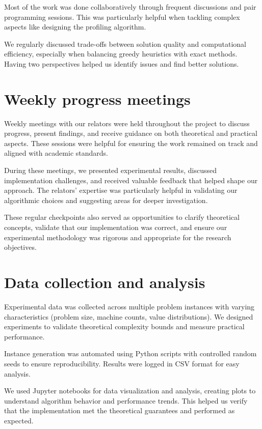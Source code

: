 Most of the work was done collaboratively through frequent discussions and pair programming sessions.
This was particularly helpful when tackling complex aspects like designing the profiling algorithm.

We regularly discussed trade-offs between solution quality and computational efficiency, especially when balancing greedy heuristics with exact methods.
Having two perspectives helped us identify issues and find better solutions.

\section{Weekly progress meetings}

Weekly meetings with our relators were held throughout the project to discuss progress, present findings, and receive guidance on both theoretical and practical aspects.
These sessions were helpful for ensuring the work remained on track and aligned with academic standards.

During these meetings, we presented experimental results, discussed implementation challenges, and received valuable feedback that helped shape our approach.
The relators' expertise was particularly helpful in validating our algorithmic choices and suggesting areas for deeper investigation.

These regular checkpoints also served as opportunities to clarify theoretical concepts, validate that our implementation was correct, and ensure our experimental methodology was rigorous and appropriate for the research objectives.

\section{Data collection and analysis}

Experimental data was collected across multiple problem instances with varying characteristics (problem size, machine counts, value distributions).
We designed experiments to validate theoretical complexity bounds and measure practical performance.

Instance generation was automated using Python scripts with controlled random seeds to ensure reproducibility.
Results were logged in CSV format for easy analysis.

We used Jupyter notebooks for data visualization and analysis, creating plots to understand algorithm behavior and performance trends.
This helped us verify that the implementation met the theoretical guarantees and performed as expected.